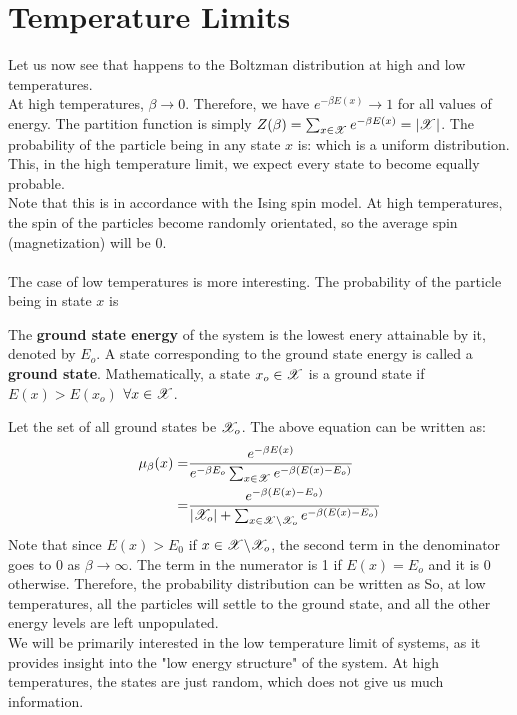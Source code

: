 \documentclass[letterpaper,english,12pt]{article}
\begin{document}
\section{Temperature Limits}
Let us now see that happens to the Boltzman distribution at high and low temperatures. \\
At high temperatures, $\beta \rightarrow 0$. Therefore, we have $e^{-\beta E(x)} \rightarrow 1$ for all values of energy. The partition function is simply $Z(\beta)=\sum_{x \in \mathscr{X}} e^{-\beta E(x)}=| \mathscr{X} |$. The probability of the particle being in any state $x$ is:
which is a uniform distribution. This, in the high temperature limit, we expect every state to become equally probable.\\
Note that this is in accordance with the Ising spin model. At high temperatures, the spin of the particles become randomly orientated, so the average spin (magnetization) will be 0. \\\\
The case of low temperatures is more interesting. The probability of the particle being in state $x$ is 
\begin{defn}
The \textbf{ground state energy} of the system is the lowest enery attainable by it, denoted by $E_o$. A state corresponding to the ground state energy is called a \textbf{ground state}. Mathematically, a state $x_o \in \mathscr{X}$ is a ground state if $E(x)>E(x_o)$  $\forall x \in \mathscr{X}$. 
\end{defn}
 Let the set of all ground states be $\mathscr{X}_o$. The above equation can be written as:
\begin{align*}
\mu_{\beta} (x)=&\frac{e^{-\beta E(x)}}{e^{-\beta E_o} \sum_{x \in \mathscr{X}} e^{-\beta \left(E(x)-E_o\right)}} \\
=&\frac{e^{-\beta (E(x)-E_o)}}{|\mathscr{X}_o|+\sum_{x \in \mathscr{X} \backslash \mathscr{X}_o} e^{-\beta (E(x)-E_o)}}
\end{align*}
Note that since $E(x)>E_0$ if $x \in \mathscr{X} \backslash \mathscr{X}_o$, the second term in the denominator goes to 0 as $\beta \rightarrow \infty$. The term in the numerator is 1 if $E(x)=E_o$ and it is 0 otherwise. Therefore, the probability distribution can be written as 
So, at low temperatures, all the particles will settle to the ground state, and all the other energy levels are left unpopulated.\\
We will be primarily interested in the low temperature limit of systems, as it provides insight into the "low energy structure" of the system. At high temperatures, the states are just random, which does not give us much information.  
\end{document}
